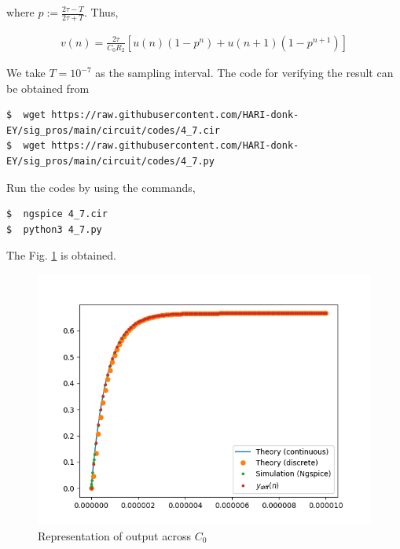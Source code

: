 \documentclass[journal,12pt,twocolumn]{IEEEtran}
\providecommand{\brak}[1]{\ensuremath{\left(#1\right)}}
\providecommand{\sbrak}[1]{\ensuremath{\left[#1\right]}}
\numberwithin{equation}{section}
\numberwithin{figure}{section}
\renewcommand\thesection{\arabic{section}}
\begin{document}
\begin{enumerate}[label=\thesection.\arabic*,ref=\thesection.\theenumi]
			where $p := \frac{2\tau-T}{2\tau+T}$. Thus,

			\begin{align}
				v(n) = \frac{2\tau}{C_0R_2}\sbrak{u(n)\brak{1-p^n}+u(n+1)\brak{1-p^{n+1}}}
			\end{align}

			We take $T = 10^{-7}$ as the sampling interval. The code for verifying the result can be obtained from

			\begin{lstlisting}
$  wget https://raw.githubusercontent.com/HARI-donk-EY/sig_pros/main/circuit/codes/4_7.cir
$  wget https://raw.githubusercontent.com/HARI-donk-EY/sig_pros/main/circuit/codes/4_7.py
			\end{lstlisting}
			
			Run the codes by using the commands,
			
			\begin{lstlisting}
$  ngspice 4_7.cir
$  python3 4_7.py
			\end{lstlisting}
			The Fig. \ref{fig:4.7} is obtained.
			\begin{figure}[h]
				\begin{center}
					\includegraphics[width=\columnwidth]{figs/4_7}
				\end{center}
				\caption{Representation of output across $C_0$}
				\label{fig:4.7}
			\end{figure}
	\end{enumerate}
\end{document}
